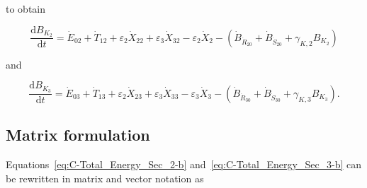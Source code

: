 \noindent{}to obtain

\begin{equation} \label{eq:C-Total_Energy_Sec_2-b}
	\frac{\mathrm{d}B_{K_{2}}}{\mathrm{d}t}
	= \dot{E}_{02}
	+ \dot{T}_{12}
	+ \varepsilon_{2} \dot{X}_{22}
	+ \varepsilon_{3} \dot{X}_{32}
	- \varepsilon_{2} \dot{X}_{2}
	- \left( \dot{B}_{\dot{R}_{20}} 
							+ \dot{B}_{\dot{S}_{20}}
							+ \gamma_{K,2} B_{K_{2}}
							\right)
\end{equation}

\noindent{}and

\begin{equation} \label{eq:C-Total_Energy_Sec_3-b}
	\frac{\mathrm{d}B_{K_{3}}}{\mathrm{d}t}
	= \dot{E}_{03}
	+ \dot{T}_{13}
	+ \varepsilon_{2} \dot{X}_{23}
	+ \varepsilon_{3} \dot{X}_{33}
	- \varepsilon_{3} \dot{X}_{3}
	- \left( \dot{B}_{\dot{R}_{30}} 
							+ \dot{B}_{\dot{S}_{30}}
							+ \gamma_{K,3} B_{K_{3}}
							\right).
\end{equation}


\subsection{Matrix formulation} %
\label{sec:C-matrix}

\noindent{}Equations~\ref{eq:C-Total_Energy_Sec_2-b} 
and~\ref{eq:C-Total_Energy_Sec_3-b} can be rewritten 
in matrix and vector notation as

